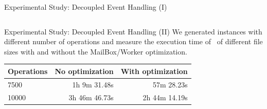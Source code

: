 \begin{frame}{Experimental Study: Decoupled Event Handling (I)}
\begin{columns}
    \end{columns}
\end{frame}

\begin{frame}{Experimental Study: Decoupled Event Handling (II)}
    We generated instances with different number of operations and measure the execution time of \DPmst\ of different file sizes with and without the MailBox/Worker optimization.

    \begin{table}[H]
        \centering
        \begin{tabular}{@{}lrr@{}}
        \toprule
        Operations & No optimization & With optimization \\ \midrule
        7500       & 1h 9m 31.48s    & 57m 28.23s        \\
        10000      & 3h 46m 46.73s   & 2h 44m 14.19s     \\ \bottomrule
        \end{tabular}
    \end{table}
\end{frame}


